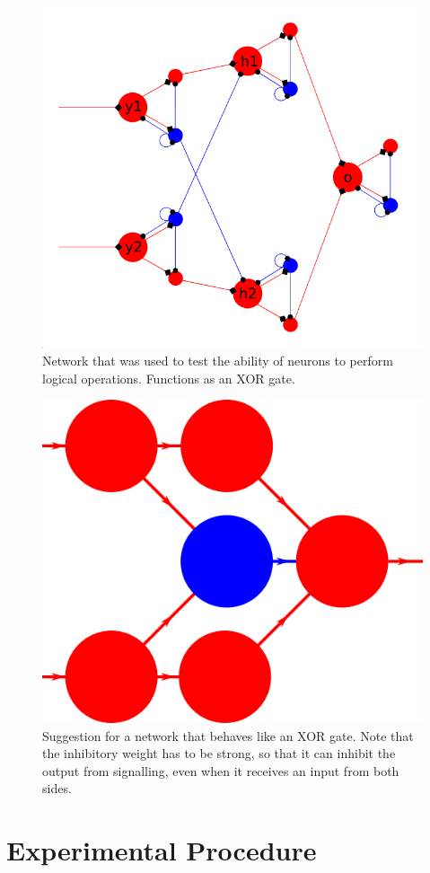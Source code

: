 \documentclass[10pt,a4paper]{article}
\begin{document}
\begin{figure}
    \centering
    \includegraphics[width=\textwidth]{figures/XOR-used.png}
    \caption{Network that was used to test the ability of neurons to perform
        logical operations. Functions as an XOR gate.}
    \label{fig:XOR-used}
\end{figure}

\begin{figure}
    \centering
    \includegraphics[width=.3\textwidth]{figures/XOR-suggested.png}
    \caption{Suggestion for a network that behaves like an XOR gate. Note that
        the inhibitory weight has to be strong, so that it can inhibit the output
        from signalling, even when it receives an input from both sides.}
    \label{fig:XOR-suggested}
\end{figure}

\section{Experimental Procedure}
\end{document}
